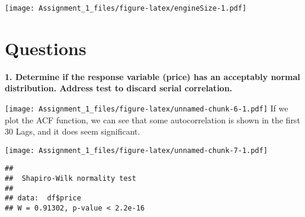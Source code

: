 \documentclass[
]{article}
\newenvironment{Shaded}{\begin{snugshade}}{\end{snugshade}}
\newcommand{\AttributeTok}[1]{\textcolor[rgb]{0.77,0.63,0.00}{#1}}
\newcommand{\DecValTok}[1]{\textcolor[rgb]{0.00,0.00,0.81}{#1}}
\newcommand{\FunctionTok}[1]{\textcolor[rgb]{0.00,0.00,0.00}{#1}}
\newcommand{\NormalTok}[1]{#1}
\newcommand{\OtherTok}[1]{\textcolor[rgb]{0.56,0.35,0.01}{#1}}
\newcommand{\SpecialCharTok}[1]{\textcolor[rgb]{0.00,0.00,0.00}{#1}}
\newcommand{\StringTok}[1]{\textcolor[rgb]{0.31,0.60,0.02}{#1}}
\begin{document}
\texttt{[image: Assignment\_1\_files/figure-latex/engineSize-1.pdf]}

\newpage

\newpage

\hypertarget{questions}{%
\section{Questions}\label{questions}}

\textbf{1. Determine if the response variable (price) has an acceptably normal distribution. Address test to
discard serial correlation.}

\begin{Shaded}
\end{Shaded}

\texttt{[image: Assignment\_1\_files/figure-latex/unnamed-chunk-6-1.pdf]}
If we plot the ACF function, we can see that some autocorrelation is
shown in the first 30 Lags, and it does seem significant.

\begin{Shaded}
\end{Shaded}

\texttt{[image: Assignment\_1\_files/figure-latex/unnamed-chunk-7-1.pdf]}

\begin{Shaded}
\end{Shaded}

\begin{verbatim}
## 
##  Shapiro-Wilk normality test
## 
## data:  df$price
## W = 0.91302, p-value < 2.2e-16
\end{verbatim}
\end{document}
